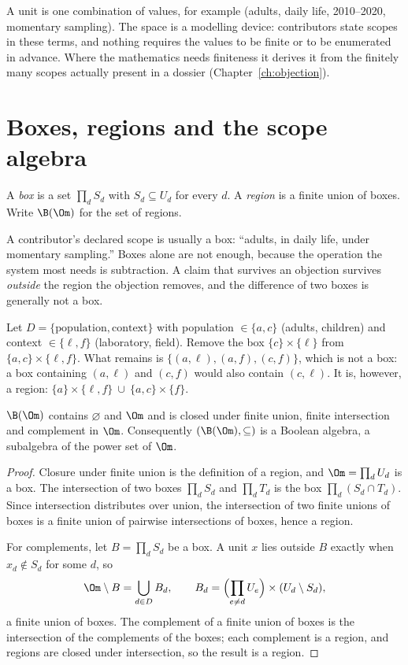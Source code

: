 A unit is one combination of values, for example (adults, daily life, 2010--2020, momentary sampling). The space is a modelling device: contributors state scopes in these terms, and nothing requires the values to be finite or to be enumerated in advance. Where the mathematics needs finiteness it derives it from the finitely many scopes actually present in a dossier (Chapter~\ref{ch:objection}).

\section{Boxes, regions and the scope algebra}

\begin{definition}
A \emph{box} is a set $\prod_{d}S_d$ with $S_d\subseteq U_d$ for every $d$. A \emph{region} is a finite union of boxes. Write $\B(\Om)$ for the set of regions.
\end{definition}

A contributor's declared scope is usually a box: ``adults, in daily life, under momentary sampling.'' Boxes alone are not enough, because the operation the system most needs is subtraction. A claim that survives an objection survives \emph{outside} the region the objection removes, and the difference of two boxes is generally not a box.

\begin{example}
Let $D=\{\text{population},\text{context}\}$ with population $\in\{a,c\}$ (adults, children) and context $\in\{\ell,f\}$ (laboratory, field). Remove the box $\{c\}\times\{\ell\}$ from $\{a,c\}\times\{\ell,f\}$. What remains is $\{(a,\ell),(a,f),(c,f)\}$, which is not a box: a box containing $(a,\ell)$ and $(c,f)$ would also contain $(c,\ell)$. It is, however, a region: $\{a\}\times\{\ell,f\}\ \cup\ \{a,c\}\times\{f\}$.
\end{example}

\begin{proposition}\label{prop:boolean}
$\B(\Om)$ contains $\varnothing$ and $\Om$ and is closed under finite union, finite intersection and complement in $\Om$. Consequently $(\B(\Om),\subseteq)$ is a Boolean algebra, a subalgebra of the power set of $\Om$.
\end{proposition}

\begin{proof}
Closure under finite union is the definition of a region, and $\Om=\prod_d U_d$ is a box. The intersection of two boxes $\prod_d S_d$ and $\prod_d T_d$ is the box $\prod_d(S_d\cap T_d)$. Since intersection distributes over union, the intersection of two finite unions of boxes is a finite union of pairwise intersections of boxes, hence a region.

For complements, let $B=\prod_dS_d$ be a box. A unit $x$ lies outside $B$ exactly when $x_d\notin S_d$ for some $d$, so
\[
\Om\setminus B=\bigcup_{d\in D}B_d,\qquad B_d=\Bigl(\prod_{e\ne d}U_e\Bigr)\times(U_d\setminus S_d),
\]
a finite union of boxes. The complement of a finite union of boxes is the intersection of the complements of the boxes; each complement is a region, and regions are closed under intersection, so the result is a region.
\end{proof}

